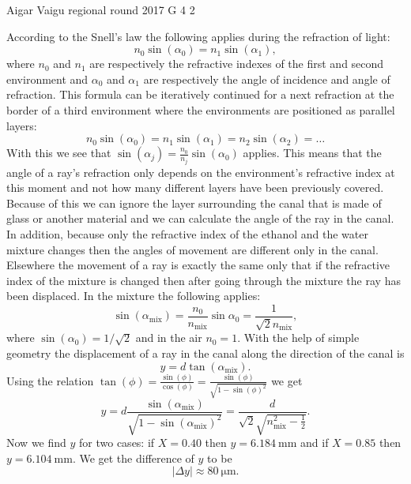 \documentclass[11pt]{article}
\begin{document}
{Aigar Vaigu} %
{regional round} %
{2017} %
{G 4} %
{2} %
{

\ifEngSolution
According to the Snell’s law the following applies during the refraction of light:
$$n_0\sin(\alpha_0)=n_1\sin(\alpha_1),$$ 
where $n_0$ and $n_1$ are respectively the refractive indexes of the first and second environment and $\alpha_0$ and $\alpha_1$ are respectively the angle of incidence and angle of refraction. This formula can be iteratively continued for a next refraction at the border of a third environment where the environments are positioned as parallel layers:
$$n_0\sin(\alpha_0)=n_1\sin(\alpha_1)=n_2\sin(\alpha_2) = \dots$$ 
With this we see that $\sin(\alpha_j)=\frac{n_0}{n_j}\sin(\alpha_0)$ applies. This means that the angle of a ray’s refraction only depends on the environment’s refractive index at this moment and not how many different layers have been previously covered. Because of this we can ignore the layer surrounding the canal that is made of glass or another material and we can calculate the angle of the ray in the canal. In addition, because only the refractive index of the ethanol and the water mixture changes then the angles of movement are different only in the canal. Elsewhere the movement of a ray is exactly the same only that if the refractive index of the mixture is changed then after going through the mixture the ray has been displaced. In the mixture the following applies:
$$\sin(\alpha_{\text{mix}})=\frac{n_0}{n_{\text{mix}}}\sin{\alpha_0} = \frac{1}{\sqrt{2}n_{\text{mix}}},$$ 
where $\sin(\alpha_0) = 1/\sqrt{2}$ and in the air $n_0=1$. With the help of simple geometry the displacement of a ray in the canal along the direction of the canal is 
$$y=d\tan(\alpha_{\text{mix}}).$$ 
Using the relation $\tan(\phi) = \frac{\sin(\phi)}{\cos(\phi)} = \frac{\sin(\phi)}{\sqrt{1-\sin(\phi)^2}}$ we get 
$$y = d \frac{\sin(\alpha_{\text{mix}})}{\sqrt{1-\sin(\alpha_{\text{mix}})^2}} = \frac{d}{\sqrt{2}\sqrt{n_{\text{mix}}^2-\frac12}}.$$ 
Now we find $y$ for two cases: if $X=\num{0.40}$ then $y=\SI{6.184}{\milli\meter}$ and if $X=\num{0.85}$ then $y=\SI{6.104}{\milli\meter}$. We get the difference of $y$ to be
$$|\Delta y| \approx \SI{80}{\micro\meter}.$$
\fi
}
\end{document}
